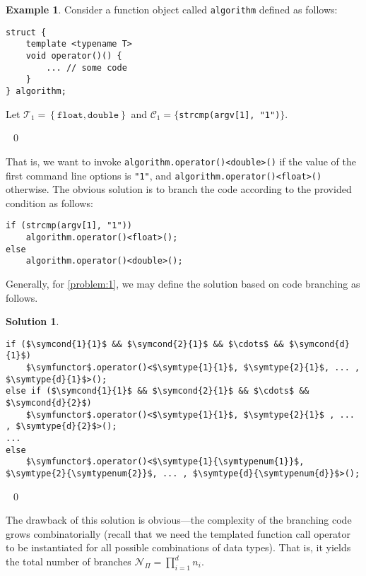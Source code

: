 \documentclass[10pt,a4paper]{article}
\theoremstyle{definition}\newtheorem{problem}{Problem}
\newtheorem{example}{Example}
\newtheorem{solution}{Solution}
\providecommand{\symtypeset}[1]{\ensuremath{\mathcal{T}_{#1}}}
\providecommand{\symtype}[2]{\ensuremath{t_{#1}^{#2}}}
\providecommand{\symtypenum}[1]{\ensuremath{n_{#1}}}
\providecommand{\symcondset}[1]{\ensuremath{\mathcal{C}_{#1}}\xspace}
\providecommand{\symcond}[2]{\ensuremath{c_{#1}^{#2}}}
\providecommand{\symfunctor}{\ensuremath{\mathtt{f}}}
\providecommand{\symcbprod}{\ensuremath{\mathcal{N}_{\Pi}}\xspace}
\begin{document}
\begin{example}
\label{example:1}
Consider a function object called \texttt{algorithm} defined as follows:{
\begin{lstlisting}
struct {
    template <typename T>
    void operator()() {
        ... // some code
    }
} algorithm;
\end{lstlisting}
}
\noindent
Let $\symtypeset{1}=\left\{\mathtt{float,double}\right\}$ and $\symcondset{1}=\{$\verb|strcmp(argv[1], "1")|$\}$.

\ \qed
\end{example}
That is, we want to invoke \texttt{algorithm.operator()<double>()} if the value of the first command line options is \texttt{"1"}, and \texttt{algorithm.operator()<float>()} otherwise. The obvious solution is to branch the code according to the provided condition as follows:
\begin{lstlisting}
if (strcmp(argv[1], "1")) 
    algorithm.operator()<float>(); 
else
    algorithm.operator()<double>();
\end{lstlisting}

Generally, for \autoref{problem:1}, we may define the solution based on code branching as follows.
\begin{solution}\ 
\begin{lstlisting}
if ($\symcond{1}{1}$ && $\symcond{2}{1}$ && $\cdots$ && $\symcond{d}{1}$)
    $\symfunctor$.operator()<$\symtype{1}{1}$, $\symtype{2}{1}$, ... , $\symtype{d}{1}$>();
else if ($\symcond{1}{1}$ && $\symcond{2}{1}$ && $\cdots$ && $\symcond{d}{2}$)
    $\symfunctor$.operator()<$\symtype{1}{1}$, $\symtype{2}{1}$ , ... , $\symtype{d}{2}$>();
...
else
    $\symfunctor$.operator()<$\symtype{1}{\symtypenum{1}}$, $\symtype{2}{\symtypenum{2}}$, ... , $\symtype{d}{\symtypenum{d}}$>();
\end{lstlisting}

\vspace{-.4em} \ \qed
\end{solution}

\vspace{-.6em}
The drawback of this solution is obvious---the complexity of the branching code grows combinatorially (recall that we need the templated function call operator to be instantiated for all possible combinations of data types). That is, it yields the total number of branches $\symcbprod=\prod_{i=1}^{d}\symtypenum{i}$.
\end{document}
